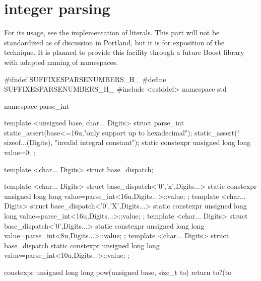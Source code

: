 \documentclass[ebook,11pt,article]{memoir}
\begin{document}
\section{integer parsing}
For its usage, see the implementation of  literals. This part will not be standardized as of discussion in Portland, but it is for exposition of the technique. It is planned to provide this facility through a future Boost library with adapted naming of namespaces.
\begin{codeblock}
#ifndef SUFFIXESPARSENUMBERS_H_
#define SUFFIXESPARSENUMBERS_H_
#include <cstddef>
namespace std {
namespace parse_int {
template <unsigned base, char... Digits>
struct parse_int{
    static_assert(base<=16u,"only support up to hexadecimal");
    static_assert(! sizeof...(Digits), "invalid integral constant");
    static constexpr unsigned long long value=0;
};

template <char... Digits>
struct base_dispatch;

template <char... Digits>
struct base_dispatch<'0','x',Digits...>{
    static constexpr unsigned long long value=parse_int<16u,Digits...>::value;
};
template <char... Digits>
struct base_dispatch<'0','X',Digits...>{
    static constexpr unsigned long long value=parse_int<16u,Digits...>::value;
};
template <char... Digits>
struct base_dispatch<'0',Digits...>{
    static constexpr unsigned long long value=parse_int<8u,Digits...>::value;
};
template <char... Digits>
struct base_dispatch{
    static constexpr unsigned long long value=parse_int<10u,Digits...>::value;
};

constexpr unsigned long long
pow(unsigned base, size_t to) {
    return to?(to%
}

}}
\end{codeblock}
\end{document}
